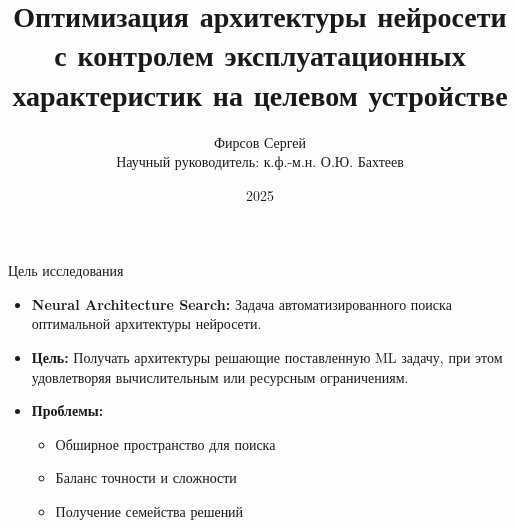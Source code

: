 \documentclass{beamer}
\title{Оптимизация архитектуры нейросети с контролем эксплуатационных характеристик на целевом устройстве}
\author{Фирсов Сергей \\ \vspace{5pt} Научный руководитель: к.ф.-м.н. О.Ю. Бахтеев}
\institute{Московский физико-технический институт}
\date{2025}
\begin{document}
\begin{frame}
    \titlepage
\end{frame} %


\begin{frame}{Цель исследования}

\begin{itemize}

    \item \textbf{Neural Architecture Search:} 
    Задача автоматизированного поиска оптимальной архитектуры нейросети. 

    \vspace{10pt}
    
    \item \textbf{Цель:} 
    Получать архитектуры решающие поставленную ML задачу, при этом удовлетворяя вычислительным или ресурсным ограничениям.
    
    \vspace{10pt}

    
    \item \textbf{Проблемы:} %
    \begin{itemize}
        \footnotesize
        \item {Обширное пространство для поиска}
        \item {Баланс точности и сложности}
        \item {Получение семейства решений}
    \end{itemize}
    \end{itemize}
 
\end{frame}
\end{document}
